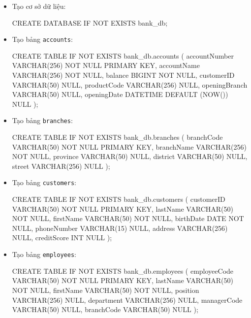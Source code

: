 
\begin{itemize}

    \item Tạo cơ sở dữ liệu: 
    \begin{MySQLCode}
        CREATE DATABASE IF NOT EXISTS bank_db;
    \end{MySQLCode}

    \item Tạo bảng \texttt{accounts}:
    \begin{MySQLCode}
        CREATE TABLE IF NOT EXISTS bank_db.accounts (
            accountNumber VARCHAR(256) NOT NULL PRIMARY KEY,
            accountName   VARCHAR(256) NOT NULL,
            balance       BIGINT       NOT NULL,
            customerID    VARCHAR(50)  NULL,
            productCode   VARCHAR(256) NULL,
            openingBranch VARCHAR(50)  NULL,
            openingDate   DATETIME DEFAULT (NOW()) NULL
        );
    \end{MySQLCode}

    \item Tạo bảng \texttt{branches}:
    \begin{MySQLCode}
        CREATE TABLE IF NOT EXISTS bank_db.branches (
            branchCode VARCHAR(50)  NOT NULL PRIMARY KEY,
            branchName VARCHAR(256) NOT NULL,
            province   VARCHAR(50)  NULL,
            district   VARCHAR(50)  NULL,
            street     VARCHAR(256) NULL
        );
    \end{MySQLCode}

    \item Tạo bảng \texttt{customers}:
    \begin{MySQLCode}
        CREATE TABLE IF NOT EXISTS bank_db.customers (
            customerID  VARCHAR(50)  NOT NULL PRIMARY KEY,
            lastName    VARCHAR(50)  NOT NULL,
            firstName   VARCHAR(50)  NOT NULL,
            birthDate   DATE         NOT NULL,
            phoneNumber VARCHAR(15)  NULL,
            address     VARCHAR(256) NULL,
            creditScore INT          NULL
        );
    \end{MySQLCode}

    \item Tạo bảng \texttt{employees}:
    \begin{MySQLCode}
        CREATE TABLE IF NOT EXISTS bank_db.employees (
            employeeCode VARCHAR(50)  NOT NULL PRIMARY KEY,
            lastName     VARCHAR(50)  NOT NULL,
            firstName    VARCHAR(50)  NOT NULL,
            position     VARCHAR(256) NULL,
            department   VARCHAR(256) NULL,
            managerCode  VARCHAR(50)  NULL,
            branchCode   VARCHAR(50)  NULL
        );
    \end{MySQLCode}


\end{itemize}
